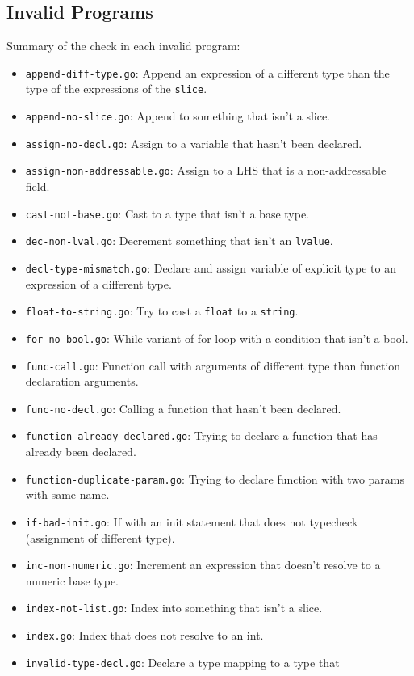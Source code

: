 \documentclass[11pt]{article}
\begin{document}
\subsection{Invalid Programs}
\label{sec:org88f27fe}
Summary of the check in each invalid program:
\begin{itemize}
\item \texttt{append-diff-type.go}: Append an expression of a different type than
the type of the expressions of the \texttt{slice}.
\item \texttt{append-no-slice.go}: Append to something that isn't a slice.
\item \texttt{assign-no-decl.go}: Assign to a variable that hasn't been declared.
\item \texttt{assign-non-addressable.go}: Assign to a LHS that is a
non-addressable field.
\item \texttt{cast-not-base.go}: Cast to a type that isn't a base type.
\item \texttt{dec-non-lval.go}: Decrement something that isn't an \texttt{lvalue}.
\item \texttt{decl-type-mismatch.go}: Declare and assign variable of explicit type
to an expression of a different type.
\item \texttt{float-to-string.go}: Try to cast a \texttt{float} to a \texttt{string}.
\item \texttt{for-no-bool.go}: While variant of for loop with a condition that isn't
a bool.
\item \texttt{func-call.go}: Function call with arguments of different type than
function declaration arguments.
\item \texttt{func-no-decl.go}: Calling a function that hasn't been declared.
\item \texttt{function-already-declared.go}: Trying to declare a function that
has already been declared.
\item \texttt{function-duplicate-param.go}: Trying to declare function with two
params with same name.
\item \texttt{if-bad-init.go}: If with an init statement that does not typecheck
(assignment of different type).
\item \texttt{inc-non-numeric.go}: Increment an expression that doesn't resolve
to a numeric base type.
\item \texttt{index-not-list.go}: Index into something that isn't a slice.
\item \texttt{index.go}: Index that does not resolve to an int.
\item \texttt{invalid-type-decl.go}: Declare a type mapping to a type that

\end{itemize}
\end{document}
